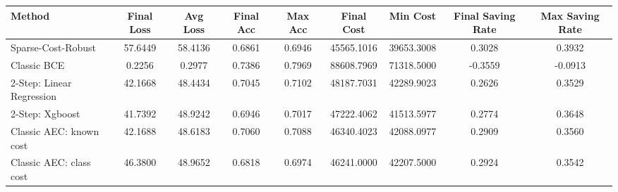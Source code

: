 \begin{tabular}{lcccccccc}
\toprule
Method & Final Loss & Avg Loss & Final Acc & Max Acc & Final Cost & Min Cost & Final Saving Rate & Max Saving Rate \\
\midrule
Sparse-Cost-Robust & 57.6449 & 58.4136 & 0.6861 & 0.6946 & 45565.1016 & 39653.3008 & 0.3028 & 0.3932 \\
Classic BCE & 0.2256 & 0.2977 & 0.7386 & 0.7969 & 88608.7969 & 71318.5000 & -0.3559 & -0.0913 \\
2-Step: Linear Regression & 42.1668 & 48.4434 & 0.7045 & 0.7102 & 48187.7031 & 42289.9023 & 0.2626 & 0.3529 \\
2-Step: Xgboost & 41.7392 & 48.9242 & 0.6946 & 0.7017 & 47222.4062 & 41513.5977 & 0.2774 & 0.3648 \\
Classic AEC: known cost & 42.1688 & 48.6183 & 0.7060 & 0.7088 & 46340.4023 & 42088.0977 & 0.2909 & 0.3560 \\
Classic AEC: class cost & 46.3800 & 48.9652 & 0.6818 & 0.6974 & 46241.0000 & 42207.5000 & 0.2924 & 0.3542 \\
\bottomrule
\end{tabular}
